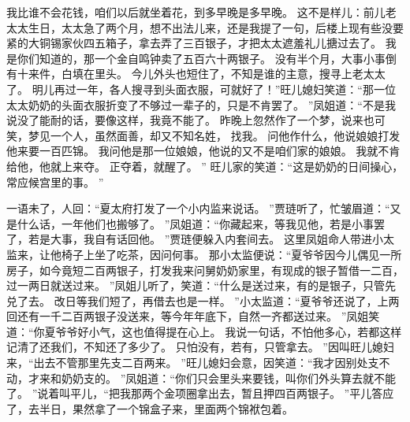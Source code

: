 我比谁不会花钱，咱们以后就坐着花，到多早晚是多早晚。
这不是样儿：前儿老太太生日，太太急了两个月，想不出法儿来，还是我提了一句，后楼上现有些没要紧的大铜锡家伙四五箱子，拿去弄了三百银子，才把太太遮羞礼儿搪过去了。
我是你们知道的，那一个金自鸣钟卖了五百六十两银子。
没有半个月，大事小事倒有十来件，白填在里头。
今儿外头也短住了，不知是谁的主意，搜寻上老太太了。
明儿再过一年，各人搜寻到头面衣服，可就好了！”旺儿媳妇笑道：“那一位太太奶奶的头面衣服折变了不够过一辈子的，只是不肯罢了。
”凤姐道：“不是我说没了能耐的话，要像这样，我竟不能了。
昨晚上忽然作了一个梦，说来也可笑，梦见一个人，虽然面善，却又不知名姓，
找我。
问他作什么，他说娘娘打发他来要一百匹锦。
我问他是那一位娘娘，他说的又不是咱们家的娘娘。
我就不肯给他，他就上来夺。
正夺着，就醒了。
”
旺儿家的笑道：“这是奶奶的日间操心，常应候宫里的事。
”\par
一语未了，人回：“夏太府打发了一个小内监来说话。
”贾琏听了，忙皱眉道：“又是什么话，一年他们也搬够了。
”凤姐道：“你藏起来，等我见他，若是小事罢了，若是大事，我自有话回他。
”贾琏便躲入内套间去。
这里凤姐命人带进小太监来，让他椅子上坐了吃茶，因问何事。
那小太监便说：“夏爷爷因今儿偶见一所房子，如今竟短二百两银子，打发我来问舅奶奶家里，有现成的银子暂借一二百，过一两日就送过来。
”凤姐儿听了，笑道：“什么是送过来，有的是银子，只管先兑了去。
改日等我们短了，再借去也是一样。
”小太监道：“夏爷爷还说了，上两回还有一千二百两银子没送来，等今年年底下，自然一齐都送过来。
”凤姐笑道：“你夏爷爷好小气，这也值得提在心上。
我说一句话，不怕他多心，若都这样记清了还我们，不知还了多少了。
只怕没有，若有，只管拿去。
”因叫旺儿媳妇来，“出去不管那里先支二百两来。
”旺儿媳妇会意，因笑道：“我才因别处支不动，才来和奶奶支的。
”凤姐道：“你们只会里头来要钱，叫你们外头算去就不能了。
”说着叫平儿，“把我那两个金项圈拿出去，暂且押四百两银子。
”平儿答应了，去半日，果然拿了一个锦盒子来，里面两个锦袱包着。
